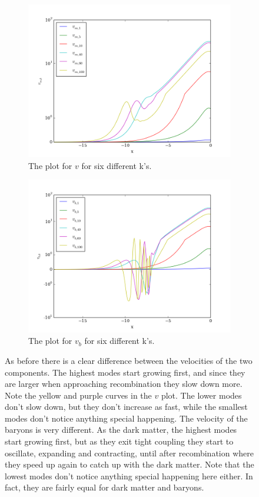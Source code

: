 \documentclass[a4paper]{report}
\begin{document}
\begin{figure}
\begin{subfigure}{.5\textwidth}
  \includegraphics[width=\textwidth]{v.png}
 \caption{The plot for $v$ for six different k's.}
 \label{fig:v}
\end{subfigure}
\begin{subfigure}{.5\textwidth}
\includegraphics[width=\textwidth]{vb.png}
 \caption{The plot for $v_b$ for six different k's.}
 \label{fig:vb}
\end{subfigure}
\caption{As before there is a clear difference between the velocities of the two components. The highest modes start growing first, and since they are larger when approaching recombination they slow down more. Note the yellow and purple curves in the $v$ plot. The lower modes don't slow down, but they don't increase as fast, while the smallest modes don't notice anything special happening. The velocity of the baryons is very different. As the dark matter, the highest modes start growing first, but as they exit tight coupling they start to oscillate, expanding and contracting, until after recombination where they speed up again to catch up with the dark matter. Note that the lowest modes don't notice anything special happening here either. In fact, they are fairly equal for dark matter and baryons.}
\end{figure}
\end{document}
